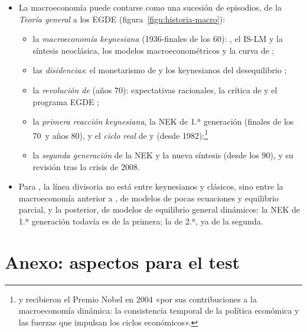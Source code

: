 \documentclass[11pt]{article}
\begin{document}
\begin{itemize}
\item La macroeconomía puede contarse como una sucesión de episodios, de la \emph{Teoría general} a los EGDE (figura~\ref{figu:historia-macro})\nocite{DeVroey2016History}:
  \begin{itemize}
  \item la \emph{macroeconomía keynesiana} (1936-finales de los 60): , el IS-LM y la síntesis neoclásica, los modelos macroeconométricos y la curva de   ;
  \item las \emph{disidencias}: el monetarismo de  y los keynesianos del desequilibrio  ;
  \item la \emph{revolución de } (años 70): expectativas racionales, la crítica de  y el programa EGDE ;
  \item la \emph{primera reacción keynesiana}, la NEK de 1.ª generación (finales de los 70~y años 80), y el \emph{ciclo real} de  y  (desde 1982);\footnote{ y  recibieron el Premio Nobel en 2004 «por sus contribuciones a la macroeconomía dinámica: la consistencia temporal de la política económica y las fuerzas que impulsan los ciclos económicos»\nocite{Nobel2004KydlandPrescott}.}
  \item la \emph{segunda generación} de la NEK y la nueva síntesis (desde los 90), y su revisión tras la crisis de 2008.
  \end{itemize}
\item Para , la línea divisoria no está entre keynesianos y clásicos, sino entre la macroeconomía anterior a , de modelos de pocas ecuaciones y equilibrio parcial, y la posterior, de modelos de equilibrio general dinámicos: la NEK de 1.ª generación todavía es de la primera; la de 2.ª, ya de la segunda.
\end{itemize}

\begin{infografia}[H]
\centering
\caption{Las escuelas de la macroeconomía, de  a hoy}\label{figu:historia-macro}
\end{infografia}

\section{Anexo: aspectos para el test}\label{anexo:test}
\end{document}
